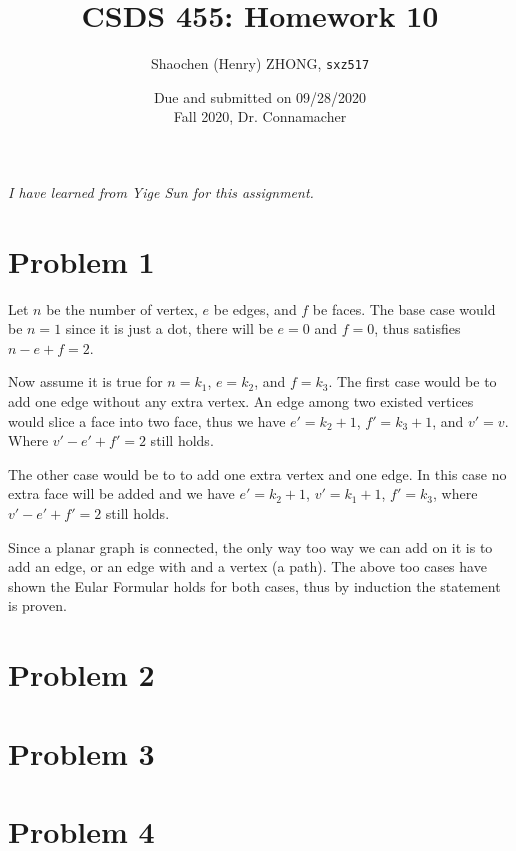 \documentclass[11pt]{article}
\newcommand{\ilc}{\texttt}
\begin{document}
\title{\textbf{CSDS 455: Homework 10}}

\author{Shaochen (Henry) ZHONG, \ilc{sxz517}}
\date{Due and submitted on 09/28/2020 \\ Fall 2020, Dr. Connamacher}
\maketitle

\textit{I have learned from Yige Sun for this assignment.}

\section*{Problem 1}

Let $n$ be the number of vertex, $e$ be edges, and $f$ be faces. The base case would be $n = 1$ since it is just a dot, there will be $e = 0$ and $f = 0$, thus satisfies $n - e + f = 2$.\newline

Now assume it is true for $n = k_1$, $e = k_2$, and $f = k_3$. The first case would be to add one edge without any extra vertex. An edge among two existed vertices would slice a face into two face, thus we have $e' = k_2 + 1$, $f' = k_3 +1$, and $v' = v$. Where $v' - e' + f' = 2$ still holds.

The other case would be to to add one extra vertex and one edge. In this case no extra face will be added and we have $e' = k_2 + 1$, $v' = k_1 + 1$, $f' = k_3$, where $v' - e' + f' = 2$ still holds.

Since a planar graph is connected, the only way too way we can add on it is to add an edge, or an edge with and a vertex (a path). The above too cases have shown the Eular Formular holds for both cases, thus by induction the statement is proven.

\section*{Problem 2}





\section*{Problem 3}
\section*{Problem 4}







%
% 
% 
\end{document}
